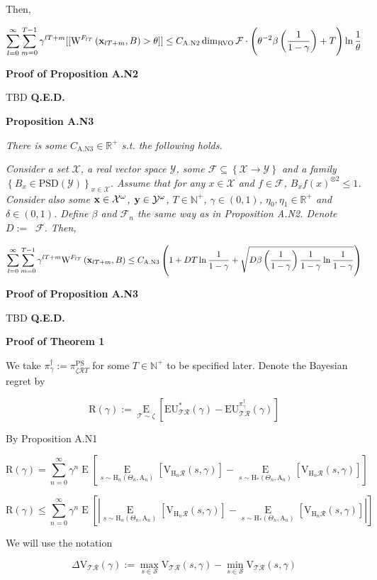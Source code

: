 \documentclass[a4paper]{article}
\newcommand{\Co}[1]{}
\newcommand{\AP}[1]{\left(#1\right)}
\newcommand{\AB}[1]{\left[#1\right]}
\newcommand{\AC}[1]{\left\{#1\right\}}
\newcommand{\Ea}[2]{\underset{#1}{\operatorname{E}}\AB{#2}}
\newcommand{\Nats}{\mathbb{N}}
\newcommand{\Reals}{\mathbb{R}}
\newcommand{\PSD}{\mathrm{PSD}}
\newcommand{\Abs}[1]{\left\vert #1 \right\vert}
\newcommand{\B}{B}
\newcommand{\X}{\mathcal{X}}
\newcommand{\Y}{\mathcal{Y}}
\newcommand{\F}{\mathcal{F}}
\newcommand{\St}{\mathcal{S}}
\newcommand{\R}{\mathcal{R}}
\newcommand{\T}{\mathcal{T}}
\DeclareMathOperator{\RVO}{\dim_{RVO}}
\newcommand{\V}{\mathrm{V}}
\newcommand{\EU}{\mathrm{EU}}
\newcommand{\Reg}{\mathrm{R}}
\newcommand{\PSR}{\text{PS}}
\newcommand{\W}{\mathrm{W}}
\newcommand{\AT}{\mathrm{A}}
\newcommand{\THy}{\mathrm{H}_*}
\newcommand{\SHy}{\mathrm{H}}
\newcommand{\De}{\Delta}
\begin{document}
Then,

$$\sum_{l=0}^\infty\sum_{m=0}^{T-1}{\gamma^{lT+m}[[\W^{F_{lT}}\AP{\bold{x}_{lT+m},B}>\theta]]} \leq C_{\mathrm{A.N2}}\RVO{\F}\cdot\AP{\theta^{-2}\beta\AP{\frac{1}{1-\gamma}}+T}\ln{\frac{1}{\theta}}$$

\textbf{Proof of Proposition A.N2}\Co{b}

TBD \textbf{Q.E.D.}\Co{b}

\textbf{Proposition A.N3}\Co{b}

\textit{There is some $C_{\mathrm{A.N3}}\in\Reals^+$ s.t. the following holds.}\Co{i}

\textit{Consider a set $\X$, a real vector space $\Y$, some $\F\subseteq\AC{\X\rightarrow\Y}$ and a family $\AC{\B _x\in\PSD(\Y)}_{x\in\X}$. Assume that for any $x\in\X$ and $f\in\F$, $\B _x{f(x)}^{\otimes2}\leq 1$. Consider also some $\bold{x}\in\X^\omega$, $\bold{y}\in\Y^\omega$, $T\in\Nats^+$, $\gamma\in(0,1)$, $\eta_0,\eta_1\in\Reals^+$ and $\delta\in(0,1)$. Define $\beta$ and $\F_n$ the same way as in Proposition A.N2. Denote $D:=\RVO{\F}$. Then,}\Co{i}

$$\sum_{l=0}^\infty\sum_{m=0}^{T-1}{\gamma^{lT+m}\W^{F_{lT}}\AP{\bold{x}_{lT+m},B}} \leq C_{\mathrm{A.N3}}\AP{1+D T\ln\frac{1}{1-\gamma}+\sqrt{D\beta\AP{\frac{1}{1-\gamma}}\frac{1}{1-\gamma}\ln{\frac{1}{1-\gamma}}}}$$

\textbf{Proof of Proposition A.N3}\Co{b}

TBD \textbf{Q.E.D.}\Co{b}

\textbf{Proof of Theorem 1}\Co{b}

We take $\pi^\dagger_\gamma:=\pi^\PSR_{\zeta\R T}$ for some $T\in\Nats^+$ to be specified later. Denote the Bayesian regret by

$$\Reg(\gamma):=\Ea{\T\sim\zeta}{\EU^*_{\T\R}(\gamma)-\EU^{\pi_{\gamma}^{\dagger}}_{\T\R}(\gamma)}$$

By Proposition A.N1

$$\Reg(\gamma)=\sum_{n=0}^\infty\gamma^{n}\Ea{}{\Ea{s\sim \SHy_n\AP{\Theta_n,\AT_n}}{\V_{\SHy_n\R}(s,\gamma)}-\Ea{s\sim \THy\AP{\Theta_n,\AT_n}}{\V_{\SHy_n\R}(s,\gamma)}}$$

$$\Reg(\gamma)\leq\sum_{n=0}^\infty\gamma^{n}\Ea{}{\Abs{\Ea{s\sim \SHy_n\AP{\Theta_n,\AT_n}}{\V_{\SHy_n\R}(s,\gamma)}-\Ea{s\sim \THy\AP{\Theta_n,\AT_n}}{\V_{\SHy_n\R}(s,\gamma)}}}$$

We will use the notation

$$\De\V_{\T\R}(\gamma):=\max_{s\in\St}{\V_{\T\R}(s,\gamma)}-\min_{s\in\St}{\V_{\T\R}(s,\gamma)}$$
\end{document}
